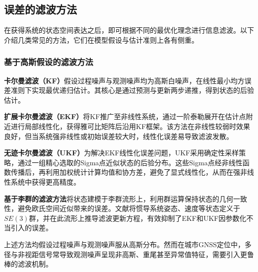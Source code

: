 





\subsection{误差的滤波方法}

在获得系统的状态空间表达之后，即可根据不同的最优化理念进行信息滤波。以下介绍几类常见的方法，它们在模型假设与估计准则上各有侧重。

\subsubsection{基于高斯假设的滤波方法}

\textbf{卡尔曼滤波（KF）}假设过程噪声与观测噪声均为高斯白噪声，在线性最小均方误差准则下实现最优递归估计。其核心是通过预测与更新两步递推，得到状态的后验估计。

\textbf{扩展卡尔曼滤波（EKF）}将KF推广至非线性系统，通过一阶泰勒展开在估计点附近进行局部线性化，获得雅可比矩阵后沿用KF框架。该方法在非线性较弱时效果良好，但当系统强非线性或初始误差较大时，线性化误差易导致滤波发散。

\textbf{无迹卡尔曼滤波（UKF）}为解决EKF线性化误差问题，UKF采用确定性采样策略，通过一组精心选取的Sigma点近似状态的后验分布。这些Sigma点经非线性函数传播后，再利用加权统计计算均值和协方差，避免了显式线性化，从而在强非线性系统中获得更高精度。

\textbf{基于李群的滤波方法}将状态建模于李群流形上，利用群运算保持状态的几何一致性，避免欧氏空间近似带来的误差。文献\cite{9737005}将惯导系统姿态、速度等状态定义于$SE(3)$群，并在此流形上推导滤波更新方程，有效抑制了EKF和UKF因参数化不当引入的误差。

上述方法均假设过程噪声与观测噪声服从高斯分布。然而在城市GNSS定位中，多径与非视距信号常导致观测噪声呈现非高斯、重尾甚至异常值特征，需要引入更鲁棒的滤波机制。

